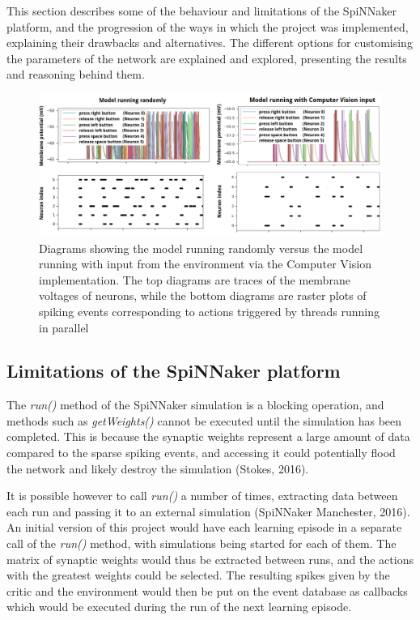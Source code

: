 \documentclass[10pt]{article}
\begin{document}
    This section describes some of the behaviour and limitations of the SpiNNaker platform, and the progression of the ways in which the project was implemented, explaining their drawbacks and alternatives. The different options for customising the parameters of the network are explained and explored, presenting the results and reasoning behind them.

    \begin{figure}[b]
    \center
    \includegraphics[width=185mm]{./diag12Long.png}
    \caption{Diagrams showing the model running randomly versus the model running with input from the environment via the Computer Vision implementation. The top diagrams are traces of the membrane voltages of neurons, while the bottom diagrams are raster plots of spiking events corresponding to actions triggered by threads running in parallel}
    \label{fig:diag}
    \end{figure}

    \subsection{Limitations of the SpiNNaker platform}

    The \textit{run()} method of the SpiNNaker simulation is a blocking operation, and methods such as \textit{getWeights()} cannot be executed until the simulation has been completed. This is because the synaptic weights represent a large amount of data compared to the sparse spiking events, and accessing it could potentially flood the network and likely destroy the simulation (Stokes, 2016).

    It is possible however to call \textit{run()} a number of times, extracting data between each run and passing it to an external simulation (SpiNNaker Manchester, 2016). An initial version of this project would have each learning episode in a separate call of the \textit{run()} method, with simulations being started for each of them. The matrix of synaptic weights would thus be extracted between runs, and the actions with the greatest weights could be selected. The resulting spikes given by the critic and the environment would then be put on the event database as callbacks which would be executed during the run of the next learning episode.
    
\end{document}

